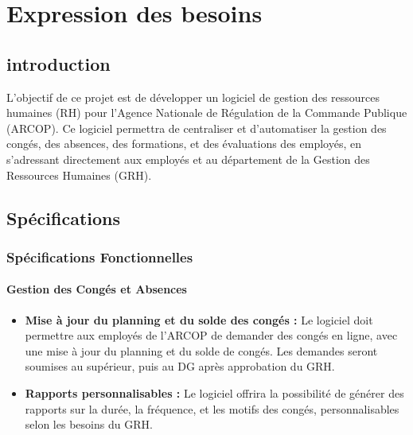 \chapter{Expression des besoins}
\clearpage
\section{introduction}

L'objectif de ce projet est de développer un logiciel de gestion des ressources humaines (RH) pour l'Agence Nationale de Régulation de la Commande Publique (ARCOP). Ce logiciel permettra de centraliser et d'automatiser la gestion des congés, des absences, des formations, et des évaluations des employés, en s'adressant directement aux employés et au département de la Gestion des Ressources Humaines (GRH).
\section{Spécifications}
\subsection{Spécifications Fonctionnelles}


\subsubsection{Gestion des Congés et Absences}
\begin{itemize}
    \item \textbf{Mise à jour du planning et du solde des congés :} Le logiciel doit permettre aux employés de l'ARCOP de demander des congés en ligne, avec une mise à jour du planning et du solde de congés. Les demandes seront soumises au supérieur, puis au DG après approbation du GRH.

    
    \item \textbf{Rapports personnalisables :} Le logiciel offrira la possibilité de générer des rapports sur la durée, la fréquence, et les motifs des congés, personnalisables selon les besoins du GRH.
    

    
  
\end{itemize}

